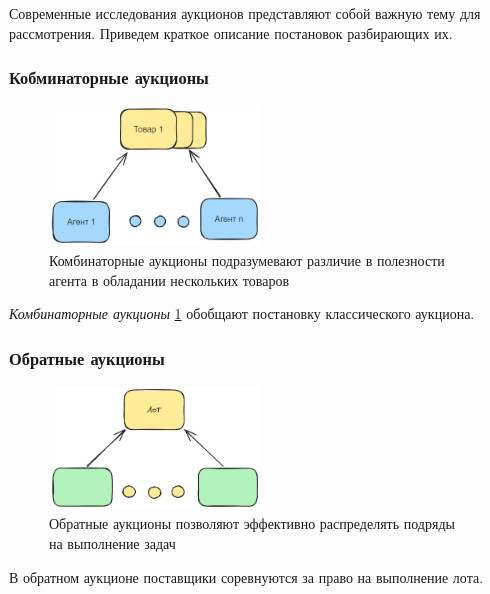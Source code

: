
Современные исследования аукционов представляют собой важную тему для рассмотрения. Приведем краткое описание постановок разбирающих их.

\subsubsection{Кобминаторные аукционы}

\begin{figure}[h]
    \centering
\includegraphics[width=0.5\textwidth]{assets/auctions/combinatorial.excalidraw.png}
    \caption{Комбинаторные аукционы подразумевают различие в полезности агента в обладании нескольких товаров}
    \label{сombinatorial}
\end{figure}

\textit{Комбинаторные аукционы} \ref{сombinatorial} обобщают постановку классического аукциона.

    



\subsubsection{Обратные аукционы}


\begin{figure}[h]
    \centering
\includegraphics[width=0.5\textwidth]{assets/auctions/reversed.excalidraw.png}
    \caption{Обратные аукционы позволяют эффективно распределять подряды на выполнение задач}
    \label{reversed}
\end{figure}

В обратном аукционе поставщики соревнуются за право на выполнение лота.



